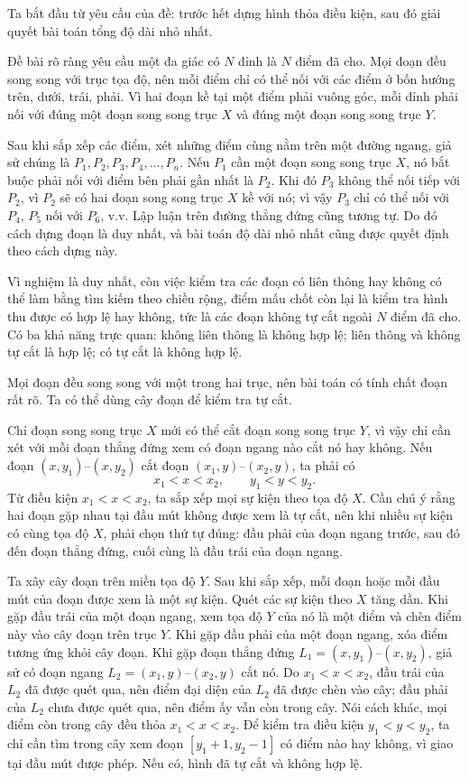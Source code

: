 \documentclass[11pt]{article}
\begin{document}
Ta bắt đầu từ yêu cầu của đề: trước hết dựng hình thỏa điều kiện, sau đó giải
quyết bài toán tổng độ dài nhỏ nhất.

Đề bài rõ ràng yêu cầu một đa giác có $N$ đỉnh là $N$ điểm đã cho. Mọi đoạn
đều song song với trục tọa độ, nên mỗi điểm chỉ có thể nối với các điểm ở bốn
hướng trên, dưới, trái, phải. Vì hai đoạn kề tại một điểm phải vuông góc, mỗi
đỉnh phải nối với đúng một đoạn song song trục $X$ và đúng một đoạn song song
trục $Y$.

Sau khi sắp xếp các điểm, xét những điểm cùng nằm trên một đường ngang, giả
sử chúng là $P_1,P_2,P_3,P_4,\ldots,P_n$. Nếu $P_1$ cần một đoạn song song
trục $X$, nó bắt buộc phải nối với điểm bên phải gần nhất là $P_2$. Khi đó
$P_3$ không thể nối tiếp với $P_2$, vì $P_2$ sẽ có hai đoạn song song trục
$X$ kề với nó; vì vậy $P_3$ chỉ có thể nối với $P_4$, $P_5$ nối với $P_6$,
v.v. Lập luận trên đường thẳng đứng cũng tương tự. Do đó cách dựng đoạn là
duy nhất, và bài toán độ dài nhỏ nhất cũng được quyết định theo cách dựng này.

Vì nghiệm là duy nhất, còn việc kiểm tra các đoạn có liên thông hay không có
thể làm bằng tìm kiếm theo chiều rộng, điểm mấu chốt còn lại là kiểm tra hình
thu được có hợp lệ hay không, tức là các đoạn không tự cắt ngoài $N$ điểm đã
cho. Có ba khả năng trực quan: không liên thông là không hợp lệ; liên thông
và không tự cắt là hợp lệ; có tự cắt là không hợp lệ.

Mọi đoạn đều song song với một trong hai trục, nên bài toán có tính chất đoạn
rất rõ. Ta có thể dùng cây đoạn để kiểm tra tự cắt.

Chỉ đoạn song song trục $X$ mới có thể cắt đoạn song song trục $Y$, vì vậy
chỉ cần xét với mỗi đoạn thẳng đứng xem có đoạn ngang nào cắt nó hay không.
Nếu đoạn $(x,y_1)$--$(x,y_2)$ cắt đoạn $(x_1,y)$--$(x_2,y)$, ta phải có
\[
  x_1<x<x_2,\qquad y_1<y<y_2.
\]
Từ điều kiện $x_1<x<x_2$, ta sắp xếp mọi sự kiện theo tọa độ $X$. Cần chú ý
rằng hai đoạn gặp nhau tại đầu mút không được xem là tự cắt, nên khi nhiều sự
kiện có cùng tọa độ $X$, phải chọn thứ tự đúng: đầu phải của đoạn ngang trước,
sau đó đến đoạn thẳng đứng, cuối cùng là đầu trái của đoạn ngang.

Ta xây cây đoạn trên miền tọa độ $Y$. Sau khi sắp xếp, mỗi đoạn hoặc mỗi đầu
mút của đoạn được xem là một sự kiện. Quét các sự kiện theo $X$ tăng dần. Khi
gặp đầu trái của một đoạn ngang, xem tọa độ $Y$ của nó là một điểm và chèn
điểm này vào cây đoạn trên trục $Y$. Khi gặp đầu phải của một đoạn ngang, xóa
điểm tương ứng khỏi cây đoạn. Khi gặp đoạn thẳng đứng
$L_1=(x,y_1)$--$(x,y_2)$, giả sử có đoạn ngang
$L_2=(x_1,y)$--$(x_2,y)$ cắt nó. Do $x_1<x<x_2$, đầu trái của $L_2$ đã được
quét qua, nên điểm đại diện của $L_2$ đã được chèn vào cây; đầu phải của
$L_2$ chưa được quét qua, nên điểm ấy vẫn còn trong cây. Nói cách khác, mọi
điểm còn trong cây đều thỏa $x_1<x<x_2$. Để kiểm tra điều kiện $y_1<y<y_2$,
ta chỉ cần tìm trong cây xem đoạn $[y_1+1,y_2-1]$ có điểm nào hay không, vì
giao tại đầu mút được phép. Nếu có, hình đã tự cắt và không hợp lệ.
\end{document}
